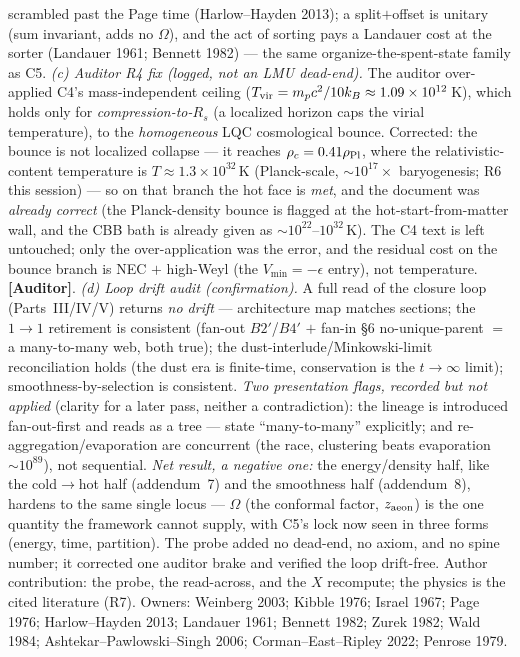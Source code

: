 \documentclass[11pt]{article}
\newcommand{\Auditor}{\textbf{\textcolor{teal!55!black}{[Auditor]}}}
\begin{document}
scrambled past the Page time (Harlow--Hayden 2013); a split$+$offset is unitary (sum invariant, adds no $\Omega$), and the act of sorting pays a Landauer cost at the sorter (Landauer 1961; Bennett 1982) --- the same organize-the-spent-state family as C5. \emph{(c) Auditor R4 fix (logged, not an LMU dead-end).} The auditor over-applied C4's mass-independent ceiling ($T_{\rm vir}=m_pc^2/10k_B\approx1.09\times10^{12}$\,K), which holds only for \emph{compression-to-$R_s$} (a localized horizon caps the virial temperature), to the \emph{homogeneous} LQC cosmological bounce. Corrected: the bounce is not localized collapse --- it reaches $\rho_c=0.41\rho_{\rm Pl}$, where the relativistic-content temperature is $T\approx1.3\times10^{32}$\,K (Planck-scale, $\sim10^{17}\times$ baryogenesis; R6 this session) --- so on that branch the hot face is \emph{met}, and the document was \emph{already correct} (the Planck-density bounce is flagged at the hot-start-from-matter wall, and the CBB bath is already given as $\sim10^{22}$--$10^{32}$\,K). The C4 text is left untouched; only the over-application was the error, and the residual cost on the bounce branch is NEC $+$ high-Weyl (the $V_{\min}=-\epsilon$ entry), not temperature. \Auditor. \emph{(d) Loop drift audit (confirmation).} A full read of the closure loop (Parts~III/IV/V) returns \emph{no drift} --- architecture map matches sections; the $1\to1$ retirement is consistent (fan-out $B2'$/$B4'$ $+$ fan-in \S6 no-unique-parent $=$ a many-to-many web, both true); the dust-interlude/Minkowski-limit reconciliation holds (the dust era is finite-time, conservation is the $t\to\infty$ limit); smoothness-by-selection is consistent. \emph{Two presentation flags, recorded but not applied} (clarity for a later pass, neither a contradiction): the lineage is introduced fan-out-first and reads as a tree --- state ``many-to-many'' explicitly; and re-aggregation/evaporation are concurrent (the race, clustering beats evaporation $\sim10^{89}$), not sequential. \emph{Net result, a negative one:} the energy/density half, like the cold$\to$hot half (addendum~7) and the smoothness half (addendum~8), hardens to the same single locus --- $\Omega$ (the conformal factor, $z_{\rm aeon}$) is the one quantity the framework cannot supply, with C5's lock now seen in three forms (energy, time, partition). The probe added no dead-end, no axiom, and no spine number; it corrected one auditor brake and verified the loop drift-free. Author contribution: the probe, the read-across, and the $X$ recompute; the physics is the cited literature (R7). Owners: Weinberg 2003; Kibble 1976; Israel 1967; Page 1976; Harlow--Hayden 2013; Landauer 1961; Bennett 1982; Zurek 1982; Wald 1984; Ashtekar--Pawlowski--Singh 2006; Corman--East--Ripley 2022; Penrose 1979.
\end{document}
